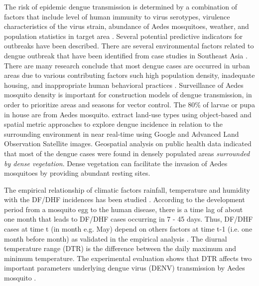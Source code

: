 \documentclass[review]{elsarticle}
\begin{document}
The risk of epidemic dengue transmission is determined by a combination of factors that include level of human immunity to virus serotypes, virulence characteristics of the virus strain, abundance of Aedes mosquitoes, weather, and population statistics in target area \cite{focks1995simulation}. Several potential predictive indicators for outbreaks have been described\cite{leitmeyer1999dengue,runge2008does,thammapalo2008environmental,sarfraz2014near}. There are several  environmental factors related to dengue outbreak that have been identified from case studies in Southeast Asia \cite{sulaiman1996relationship,thammapalo2008environmental,sarfraz2014near,nakhapakorn2005information}. There are many research conclude that most dengue cases are occurred in urban areas due to various contributing factors such high population density, inadequate housing, and inappropriate human behavioral practices \cite{chang2009combining,knudsen1992vector,troyo2009urban}.  Surveillance of Aedes mosquito density is important for construction models of dengue transmission, in order to prioritize areas and seasons for vector control. The 80\% of larvae or pupa in house are from Aedes mosquito. \cite{sarfraz2014near} extract land-use types using object-based and spatial metric approaches to explore dengue incidence in relation to the surrounding environment in near real-time using Google and Advanced Land Observation Satellite images. Geospatial analysis on public health data indicated that most of the dengue cases were found in densely populated areas \textit{surrounded by dense vegetation}. Dense vegetation can facilitate the invasion of Aedes mosquitoes by providing abundant resting sites. 

The empirical relationship of climatic factors rainfall, temperature and humidity with the DF/DHF incidences has been studied \cite{nakhapakorn2005information, li1985rainfall,hales2002potential,rueda1990temperature,tun2000effects,brady2013modelling}.  According to the development period from a mosquito egg to the human disease, there is a time lag of about one month that leads to DF/DHF cases occurring in 7 - 45 days. Thus, DF/DHF cases at time t (in month e.g. May) depend on others factors at time t-1 (i.e. one month before month) as validated in the empirical analysis \cite{nakhapakorn2005information}. The diurnal temperature range (DTR) is the difference between the daily maximum and minimum temperature. The experimental evaluation shows that DTR affects two important parameters underlying dengue virus (DENV) transmission by Aedes mosquito \cite{lambrechts2011impact}. 
\end{document}
